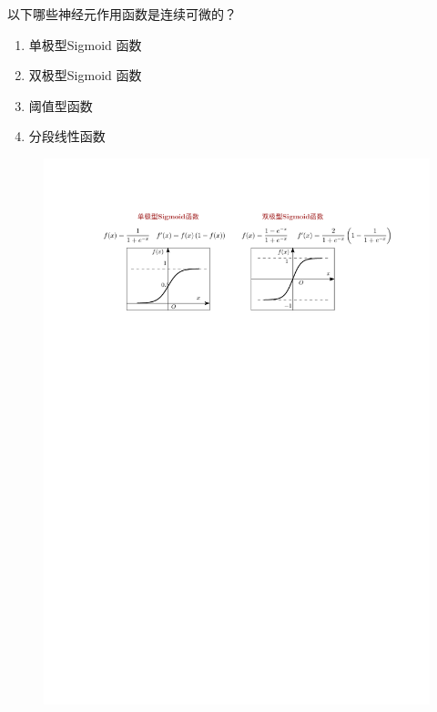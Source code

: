 \begin{example}
    以下哪些神经元\textcolor{main1}{作用函数}是连续可微的？
    \begin{enumerate}[A]
        \item \textcolor{main1}{单极型Sigmoid 函数}
        \item \textcolor{main1}{双极型Sigmoid 函数}
        \item 阈值型函数
        \item 分段线性函数
    \end{enumerate}
    \begin{figure}[htbp]
        \centering
        \includegraphics{image/BP-神经元作用函数.pdf}
    \end{figure}
\end{example}
